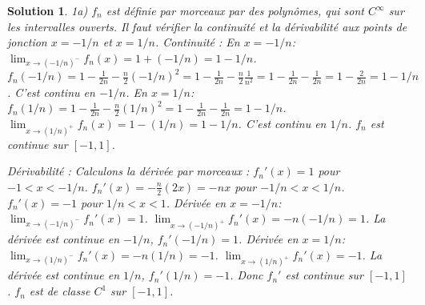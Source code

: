 \documentclass{article}
\newtheorem{solution}{Solution}
\begin{document}
\begin{solution}
1a) $f_n$ est définie par morceaux par des polynômes, qui sont $C^\infty$ sur les intervalles ouverts. Il faut vérifier la continuité et la dérivabilité aux points de jonction $x=-1/n$ et $x=1/n$.
Continuité :
En $x=-1/n$:
$\lim_{x \to (-1/n)^-} f_n(x) = 1 + (-1/n) = 1 - 1/n$.
$f_n(-1/n) = 1 - \frac{1}{2n} - \frac{n}{2} (-1/n)^2 = 1 - \frac{1}{2n} - \frac{n}{2} \frac{1}{n^2} = 1 - \frac{1}{2n} - \frac{1}{2n} = 1 - \frac{2}{2n} = 1 - 1/n$.
C'est continu en $-1/n$.
En $x=1/n$:
$f_n(1/n) = 1 - \frac{1}{2n} - \frac{n}{2} (1/n)^2 = 1 - \frac{1}{2n} - \frac{1}{2n} = 1 - 1/n$.
$\lim_{x \to (1/n)^+} f_n(x) = 1 - (1/n) = 1 - 1/n$.
C'est continu en $1/n$.
$f_n$ est continue sur $[-1, 1]$.

Dérivabilité :
Calculons la dérivée par morceaux :
$f_n'(x) = 1$ pour $-1 < x < -1/n$.
$f_n'(x) = - \frac{n}{2} (2x) = -nx$ pour $-1/n < x < 1/n$.
$f_n'(x) = -1$ pour $1/n < x < 1$.
Dérivée en $x=-1/n$:
$\lim_{x \to (-1/n)^-} f_n'(x) = 1$.
$\lim_{x \to (-1/n)^+} f_n'(x) = -n(-1/n) = 1$.
La dérivée est continue en $-1/n$, $f_n'(-1/n)=1$.
Dérivée en $x=1/n$:
$\lim_{x \to (1/n)^-} f_n'(x) = -n(1/n) = -1$.
$\lim_{x \to (1/n)^+} f_n'(x) = -1$.
La dérivée est continue en $1/n$, $f_n'(1/n)=-1$.
Donc $f_n'$ est continue sur $[-1, 1]$. $f_n$ est de classe $C^1$ sur $[-1, 1]$.


\end{solution}
\end{document}
